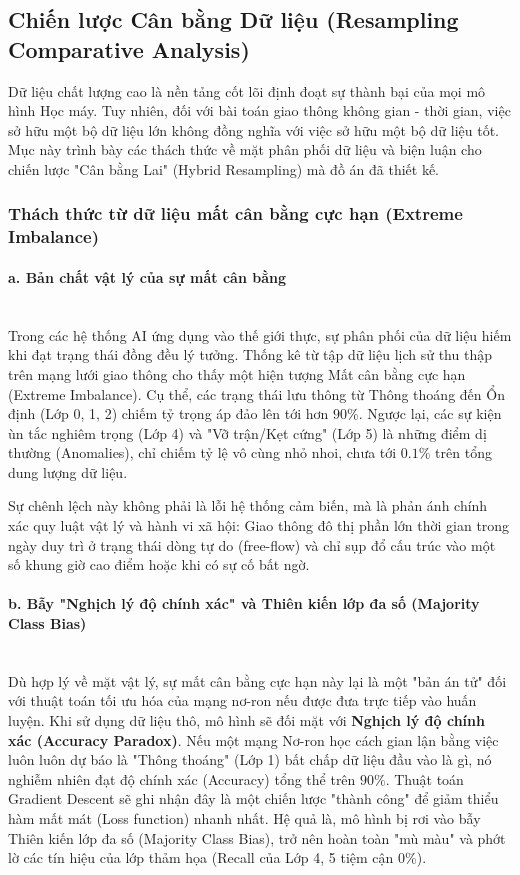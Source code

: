 \subsection{Chiến lược Cân bằng Dữ liệu (Resampling Comparative Analysis)}
\label{sec:5_3}

Dữ liệu chất lượng cao là nền tảng cốt lõi định đoạt sự thành bại của mọi mô hình Học máy. Tuy nhiên, đối với bài toán giao thông không gian - thời gian, việc sở hữu một bộ dữ liệu lớn không đồng nghĩa với việc sở hữu một bộ dữ liệu tốt. Mục này trình bày các thách thức về mặt phân phối dữ liệu và biện luận cho chiến lược "Cân bằng Lai" (Hybrid Resampling) mà đồ án đã thiết kế.

\subsubsection{Thách thức từ dữ liệu mất cân bằng cực hạn (Extreme Imbalance)}

\paragraph{a. Bản chất vật lý của sự mất cân bằng} \mbox{} \\
Trong các hệ thống AI ứng dụng vào thế giới thực, sự phân phối của dữ liệu hiếm khi đạt trạng thái đồng đều lý tưởng. Thống kê từ tập dữ liệu lịch sử thu thập trên mạng lưới giao thông cho thấy một hiện tượng Mất cân bằng cực hạn (Extreme Imbalance). Cụ thể, các trạng thái lưu thông từ Thông thoáng đến Ổn định (Lớp 0, 1, 2) chiếm tỷ trọng áp đảo lên tới hơn $90\%$. Ngược lại, các sự kiện ùn tắc nghiêm trọng (Lớp 4) và "Vỡ trận/Kẹt cứng" (Lớp 5) là những điểm dị thường (Anomalies), chỉ chiếm tỷ lệ vô cùng nhỏ nhoi, chưa tới $0.1\%$ trên tổng dung lượng dữ liệu.

Sự chênh lệch này không phải là lỗi hệ thống cảm biến, mà là phản ánh chính xác quy luật vật lý và hành vi xã hội: Giao thông đô thị phần lớn thời gian trong ngày duy trì ở trạng thái dòng tự do (free-flow) và chỉ sụp đổ cấu trúc vào một số khung giờ cao điểm hoặc khi có sự cố bất ngờ.

\paragraph{b. Bẫy "Nghịch lý độ chính xác" và Thiên kiến lớp đa số (Majority Class Bias)} \mbox{} \\
Dù hợp lý về mặt vật lý, sự mất cân bằng cực hạn này lại là một "bản án tử" đối với thuật toán tối ưu hóa của mạng nơ-ron nếu được đưa trực tiếp vào huấn luyện. Khi sử dụng dữ liệu thô, mô hình sẽ đối mặt với \textbf{Nghịch lý độ chính xác (Accuracy Paradox)}. Nếu một mạng Nơ-ron học cách gian lận bằng việc luôn luôn dự báo là "Thông thoáng" (Lớp 1) bất chấp dữ liệu đầu vào là gì, nó nghiễm nhiên đạt độ chính xác (Accuracy) tổng thể trên $90\%$. Thuật toán Gradient Descent sẽ ghi nhận đây là một chiến lược "thành công" để giảm thiểu hàm mất mát (Loss function) nhanh nhất. Hệ quả là, mô hình bị rơi vào bẫy Thiên kiến lớp đa số (Majority Class Bias), trở nên hoàn toàn "mù màu" và phớt lờ các tín hiệu của lớp thảm họa (Recall của Lớp 4, 5 tiệm cận $0\%$).

